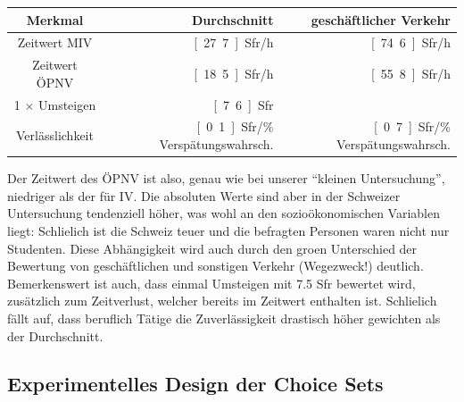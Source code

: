 \begin{center}
\begin{tabular}{|c||r|r|}
\hline
Merkmal & Durchschnitt & gesch\"aftlicher Verkehr \\ \hline\hline
Zeitwert MIV & \unit[27.7]{Sfr/h} & \unit[74.6]{Sfr/h} \\ \hline
Zeitwert \"OPNV & \unit[18.5]{Sfr/h} & \unit[55.8]{Sfr/h} \\ \hline
1 $\times$ Umsteigen & \unit[7.6]{Sfr} & \\ \hline
Verl\"asslichkeit & \unit[0.1]{Sfr/\% Versp\"atungswahrsch.} & 
   \unit[0.7]{Sfr/\% Versp\"atungswahrsch.}  \\ \hline
\end{tabular}
\end{center}
%
Der Zeitwert des \"OPNV ist also, genau wie bei unserer 
``kleinen Untersuchung'', niedriger als der f\"ur IV. Die absoluten
Werte sind aber in der Schweizer Untersuchung tendenziell h\"oher, was wohl
an den sozio\"okonomischen Variablen liegt: Schlie\3lich ist die
Schweiz teuer und die befragten Personen waren nicht nur
Studenten. Diese Abh\"angigkeit wird auch durch den gro\3en
Unterschied der Bewertung von gesch\"aftlichen und sonstigen Verkehr
(Wegezweck!) deutlich. Bemerkenswert ist auch, dass einmal
Umsteigen mit 7.5 Sfr bewertet wird, zus\"atzlich zum Zeitverlust,
welcher bereits im Zeitwert enthalten ist. Schlie\3lich f\"allt auf,
dass beruflich T\"atige die Zuverl\"assigkeit drastisch h\"oher
gewichten als der Durchschnitt.




\subsection{Experimentelles Design der Choice Sets}

